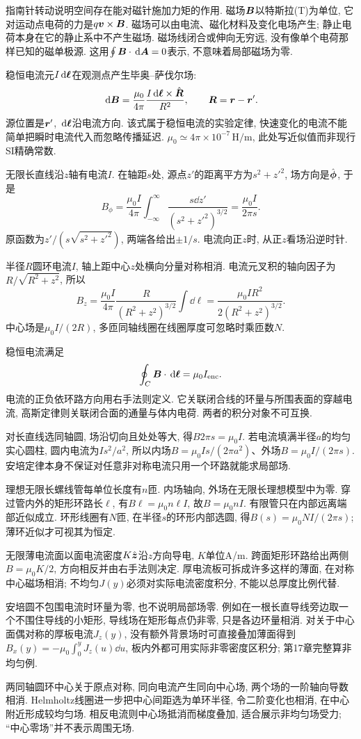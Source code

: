 \label{ch:magnetostatics}
指南针转动说明空间存在能对磁针施加力矩的作用. 磁场$\boldsymbol{B}$以特斯拉(T)为单位, 它对运动点电荷的力是$q\boldsymbol{v}\times\boldsymbol{B}$. 磁场可以由电流、磁化材料及变化电场产生; 静止电荷本身在它的静止系中不产生磁场. 磁场线闭合或伸向无穷远, 没有像单个电荷那样已知的磁单极源. 这用$\oint\boldsymbol{B}\cdot\,\mathrm d\boldsymbol{A}=0$表示, 不意味着局部磁场为零.

稳恒电流元$I\,\mathrm d\boldsymbol{\ell}$在观测点产生毕奥--萨伐尔场:
\[
\,\mathrm d\boldsymbol{B}=\frac{\mu_0}{4\pi}\frac{I\,\mathrm d\boldsymbol{\ell}\times\hat{\boldsymbol{R}}}{R^2},\qquad
\boldsymbol{R}=\boldsymbol{r}-\boldsymbol{r}'.
\]
源位置是$\boldsymbol{r}'$, $\,\mathrm d\boldsymbol{\ell}$沿电流方向. 该式属于稳恒电流的实验定律, 快速变化的电流不能简单把瞬时电流代入而忽略传播延迟. $\mu_0\simeq4\pi\times10^{-7}\,\mathrm{H/m}$, 此处写近似值而非现行SI精确常数.

无限长直线沿$z$轴有电流$I$. 在轴距$s$处, 源点$z'$的距离平方为$s^2+z'^2$, 场方向是$\hat{\boldsymbol{\phi}}$, 于是
\[
B_\phi=\frac{\mu_0I}{4\pi}\int_{-\infty}^{\infty}\frac{s\dd z'}{(s^2+z'^2)^{3/2}}
=\frac{\mu_0I}{2\pi s}.
\]
原函数为$z'/(s\sqrt{s^2+z'^2})$, 两端各给出$\pm1/s$. 电流向正$z$时, 从正$z$看场沿逆时针.

半径$R$圆环电流$I$, 轴上距中心$z$处横向分量对称相消. 电流元叉积的轴向因子为$R/\sqrt{R^2+z^2}$, 所以
\[
B_z=\frac{\mu_0I}{4\pi}\frac{R}{(R^2+z^2)^{3/2}}\int\dd\ell
=\frac{\mu_0IR^2}{2(R^2+z^2)^{3/2}}.
\]
中心场是$\mu_0I/(2R)$, 多匝同轴线圈在线圈厚度可忽略时乘匝数$N$.

稳恒电流满足
\begin{equation}\label{eq:ampere}
\oint_C\boldsymbol{B}\cdot\,\mathrm d\boldsymbol{\ell}=\mu_0I_{\rm enc}.
\end{equation}
电流的正负依环路方向用右手法则定义. 它关联闭合线的环量与所围表面的穿越电流, 高斯定律则关联闭合面的通量与体内电荷. 两者的积分对象不可互换.

对长直线选同轴圆, 场沿切向且处处等大, 得$B2\pi s=\mu_0I$. 若电流填满半径$a$的均匀实心圆柱, 圆内电流为$I s^2/a^2$, 所以内场$B=\mu_0Is/(2\pi a^2)$、外场$B=\mu_0I/(2\pi s)$. 安培定律本身不保证对任意非对称电流只用一个环路就能求局部场.

理想无限长螺线管每单位长度有$n$匝. 内场轴向, 外场在无限长理想模型中为零. 穿过管内外的矩形环路长$\ell$, 有$B\ell=\mu_0n\ell I$, 故$B=\mu_0nI$. 有限管只在内部远离端部近似成立. 环形线圈有$N$匝, 在半径$s$的环形内部选圆, 得$B(s)=\mu_0NI/(2\pi s)$; 薄环近似才可视其为恒定.

无限薄电流面以面电流密度$K\hat{\boldsymbol{z}}$沿$z$方向导电, $K$单位A/m. 跨面矩形环路给出两侧$B=\mu_0K/2$, 方向相反并由右手法则决定. 厚电流板可拆成许多这样的薄面, 在对称中心磁场相消; 不均匀$J(y)$必须对实际电流密度积分, 不能以总厚度比例代替.


安培圆不包围电流时环量为零, 也不说明局部场零. 例如在一根长直导线旁边取一个不围住导线的小矩形, 导线场在矩形每点仍非零, 只是各边环量相消. 对关于中心面偶对称的厚板电流$J_z(y)$, 没有额外背景场时可直接叠加薄面得到$B_x(y)=-\mu_0\int_0^yJ_z(u)\dd u$, 板内外都可用实际非零密度区积分; 第17章完整算非均匀例.

两同轴圆环中心关于原点对称, 同向电流产生同向中心场, 两个场的一阶轴向导数相消. Helmholtz线圈进一步把中心间距选为单环半径, 令二阶变化也相消, 在中心附近形成较均匀场. 相反电流则中心场抵消而梯度叠加, 适合展示非均匀场受力; “中心零场”并不表示周围无场.
